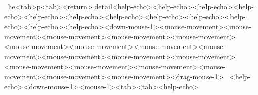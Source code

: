 he<tab>p<tab><return>detail<help-echo><help-echo><help-echo><help-echo><help-echo><help-echo><help-echo><help-echo><help-echo><help-echo><help-echo><help-echo><down-mouse-1><mouse-movement><mouse-movement><mouse-movement><mouse-movement><mouse-movement><mouse-movement><mouse-movement><mouse-movement><mouse-movement><mouse-movement><mouse-movement><mouse-movement><mouse-movement><mouse-movement><mouse-movement><mouse-movement><mouse-movement><mouse-movement><drag-mouse-1><help-echo><down-mouse-1><mouse-1><tab><tab><help-echo>